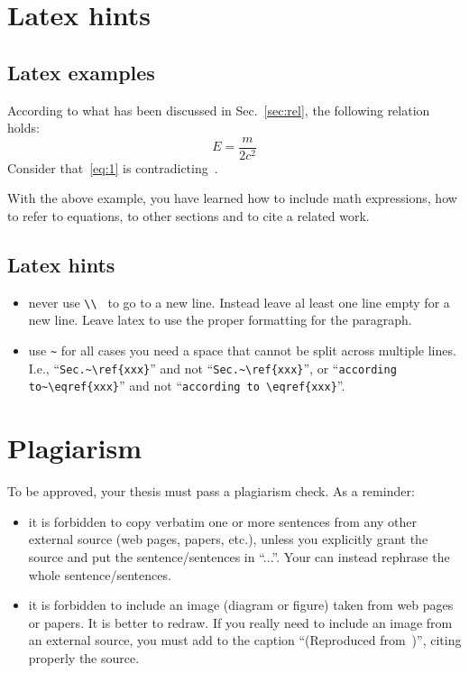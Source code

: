 \documentclass[a4paper,11pt,twoside,english]{toptesi}
\begin{document}
\section{Latex hints}

\subsection{Latex examples}

According to what has been discussed in Sec.~\ref{sec:rel}, the following relation holds:
\begin{equation}\label{eq:1}
E=\dfrac{m}{2c^2}
\end{equation}
Consider that~\eqref{eq:1} is contradicting~\cite{ein05}.

With the above example, you have learned how to include math expressions, how to refer to equations, to other sections and to cite a related work. 

\subsection{Latex hints}
\begin{itemize}
\item never use \verb|\\ | to go to a new line. Instead leave al least one line empty for a new line. Leave latex to use the proper formatting for the paragraph.
\item use \verb|~| for all cases you need a space that cannot be split across multiple lines. I.e., ``\verb|Sec.~\ref{xxx}|'' and not ``\verb|Sec.~\ref{xxx}|'', or  ``\verb|according to~\eqref{xxx}|'' and not ``\verb|according to \eqref{xxx}|''.
\end{itemize}

\section{Plagiarism}

To be approved, your thesis must pass a plagiarism check. As a reminder:
\begin{itemize}
\item it is forbidden to copy verbatim one or more sentences  from any other external source (web pages, papers, etc.), unless you explicitly  grant the source and put the sentence/sentences in ``...''. Your can instead rephrase the whole sentence/sentences.
\item it is forbidden to include an image (diagram or figure) taken from web pages or papers. It is better to redraw. If you really need to include  an image from an external source, you must add to the caption ``(Reproduced from~\cite{example})'', citing properly the source.
\end{itemize}
\end{document}
